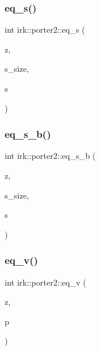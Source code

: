 \mbox{\label{namespaceirk_1_1porter2_afcb08be63530cb34cab448be85fa40c3}} 
\subsubsection{\texorpdfstring{eq\+\_\+s()}{eq\_s()}}
{\footnotesize\ttfamily int irk\+::porter2\+::eq\+\_\+s (\begin{DoxyParamCaption}\item[{struct \mbox{\hyperlink{structirk_1_1porter2_1_1SN__env}{S\+N\+\_\+env}} $\ast$}]{z,  }\item[{int}]{s\+\_\+size,  }\item[{const \mbox{\hyperlink{namespaceirk_1_1porter2_afd04c4eb58a1dabcf8f3ab2d7e9f9ed5}{symbol}} $\ast$}]{s }\end{DoxyParamCaption})}

\mbox{\label{namespaceirk_1_1porter2_af785e0dbce385d80c8c98442d9101aa3}} 
\subsubsection{\texorpdfstring{eq\+\_\+s\+\_\+b()}{eq\_s\_b()}}
{\footnotesize\ttfamily int irk\+::porter2\+::eq\+\_\+s\+\_\+b (\begin{DoxyParamCaption}\item[{struct \mbox{\hyperlink{structirk_1_1porter2_1_1SN__env}{S\+N\+\_\+env}} $\ast$}]{z,  }\item[{int}]{s\+\_\+size,  }\item[{const \mbox{\hyperlink{namespaceirk_1_1porter2_afd04c4eb58a1dabcf8f3ab2d7e9f9ed5}{symbol}} $\ast$}]{s }\end{DoxyParamCaption})}

\mbox{\label{namespaceirk_1_1porter2_a66a7929e8346eb94c0e50e3ec11a8daa}} 
\subsubsection{\texorpdfstring{eq\+\_\+v()}{eq\_v()}}
{\footnotesize\ttfamily int irk\+::porter2\+::eq\+\_\+v (\begin{DoxyParamCaption}\item[{struct \mbox{\hyperlink{structirk_1_1porter2_1_1SN__env}{S\+N\+\_\+env}} $\ast$}]{z,  }\item[{const \mbox{\hyperlink{namespaceirk_1_1porter2_afd04c4eb58a1dabcf8f3ab2d7e9f9ed5}{symbol}} $\ast$}]{p }\end{DoxyParamCaption})}

